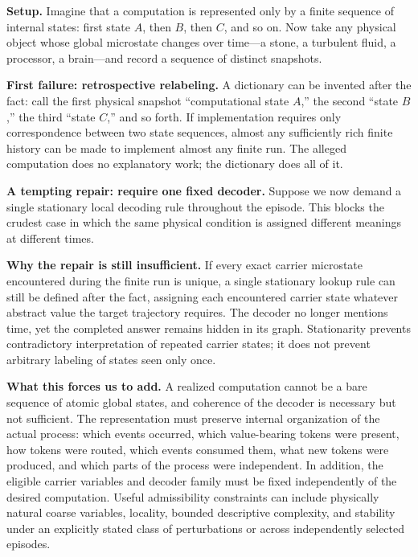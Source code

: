 \documentclass[11pt,a4paper]{article}
\newcounter{thought}
\newenvironment{thoughtbox}[1]{%
  \refstepcounter{thought}%
  \begin{tcolorbox}[
    enhanced,breakable,
    colback=white,colframe=navy,boxrule=0.85pt,
    arc=1.7mm,left=2.8mm,right=2.8mm,top=2.2mm,bottom=2.0mm,
    borderline west={2.2pt}{0pt}{blue},
    title={\large\bfseries Thought experiment \thethought: #1},
    fonttitle=\bfseries,coltitle=navy,
    attach boxed title to top left={xshift=2mm,yshift=-2mm},
    boxed title style={colback=sky,colframe=blue,boxrule=0.55pt,arc=1.2mm},
    before skip=9pt,after skip=10pt
  ]
}{\end{tcolorbox}}
\newcommand{\scene}{\medskip\textbf{Setup.} }
\begin{document}
\begin{thoughtbox}{Why a state sequence is too weak}
\scene Imagine that a computation is represented only by a finite sequence of internal states: first state $A$, then $B$, then $C$, and so on. Now take any physical object whose global microstate changes over time---a stone, a turbulent fluid, a processor, a brain---and record a sequence of distinct snapshots.

\medskip\textbf{First failure: retrospective relabeling.} A dictionary can be invented after the fact: call the first physical snapshot ``computational state $A$,'' the second ``state $B$,'' the third ``state $C$,'' and so forth. If implementation requires only correspondence between two state sequences, almost any sufficiently rich finite history can be made to implement almost any finite run. The alleged computation does no explanatory work; the dictionary does all of it.

\medskip\textbf{A tempting repair: require one fixed decoder.} Suppose we now demand a single stationary local decoding rule throughout the episode. This blocks the crudest case in which the same physical condition is assigned different meanings at different times.

\medskip\textbf{Why the repair is still insufficient.} If every exact carrier microstate encountered during the finite run is unique, a single stationary lookup rule can still be defined after the fact, assigning each encountered carrier state whatever abstract value the target trajectory requires. The decoder no longer mentions time, yet the completed answer remains hidden in its graph. Stationarity prevents contradictory interpretation of repeated carrier states; it does not prevent arbitrary labeling of states seen only once.

\medskip\textbf{What this forces us to add.} A realized computation cannot be a bare sequence of atomic global states, and coherence of the decoder is necessary but not sufficient. The representation must preserve internal organization of the actual process: which events occurred, which value-bearing tokens were present, how tokens were routed, which events consumed them, what new tokens were produced, and which parts of the process were independent. In addition, the eligible carrier variables and decoder family must be fixed independently of the desired computation. Useful admissibility constraints can include physically natural coarse variables, locality, bounded descriptive complexity, and stability under an explicitly stated class of perturbations or across independently selected episodes.


\end{thoughtbox}
\end{document}
